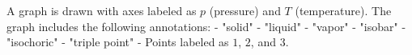 A graph is drawn with axes labeled as \( p \) (pressure) and \( T \) (temperature). The graph includes the following annotations:  
- "solid"  
- "liquid"  
- "vapor"  
- "isobar"  
- "isochoric"  
- "triple point"  
- Points labeled as \( 1 \), \( 2 \), and \( 3 \).